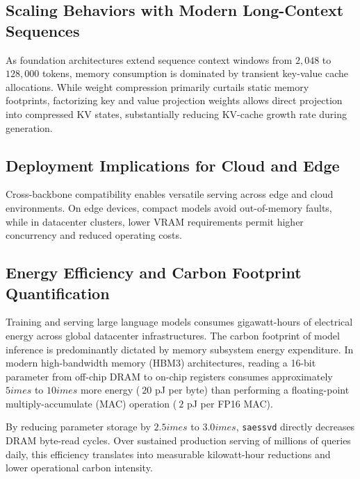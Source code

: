 \subsection{Scaling Behaviors with Modern Long-Context Sequences}
As foundation architectures extend sequence context windows from $2{,}048$ to $128{,}000$ tokens, memory consumption is dominated by transient key-value cache allocations. While weight compression primarily curtails static memory footprints, factorizing key and value projection weights allows direct projection into compressed KV states, substantially reducing KV-cache growth rate during generation.

\subsection{Deployment Implications for Cloud and Edge}
Cross-backbone compatibility enables versatile serving across edge and cloud environments. On edge devices, compact models avoid out-of-memory faults, while in datacenter clusters, lower VRAM requirements permit higher concurrency and reduced operating costs.

\subsection{Energy Efficiency and Carbon Footprint Quantification}
Training and serving large language models consumes gigawatt-hours of electrical energy across global datacenter infrastructures. The carbon footprint of model inference is predominantly dictated by memory subsystem energy expenditure. In modern high-bandwidth memory (HBM3) architectures, reading a 16-bit parameter from off-chip DRAM to on-chip registers consumes approximately $5	imes$ to $10	imes$ more energy ($~20$ pJ per byte) than performing a floating-point multiply-accumulate (MAC) operation ($~2$ pJ per FP16 MAC).

By reducing parameter storage by $2.5	imes$ to $3.0	imes$, \texttt{saessvd} directly decreases DRAM byte-read cycles. Over sustained production serving of millions of queries daily, this efficiency translates into measurable kilowatt-hour reductions and lower operational carbon intensity.
